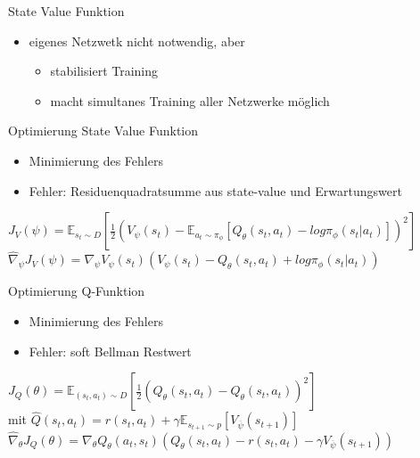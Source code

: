 \begin{frame}{State Value Funktion}
\begin{itemize}
\item eigenes Netzwetk nicht notwendig, aber
\begin{itemize}
\item stabilisiert Training
\item macht simultanes Training aller Netzwerke möglich
\end{itemize}
\end{itemize}
\end{frame}

\begin{frame}{Optimierung State Value Funktion}
\begin{itemize}
\item Minimierung des Fehlers
\item Fehler: Residuenquadratsumme aus state-value und Erwartungswert
\end{itemize}
$J_{V}(\psi)=\mathbb{E}_{s_{t}\sim D}\left[\frac{1}{2}(V_{\psi}(s_{t})-\mathbb{E}_{a_{t}\sim \pi_{\phi}}[Q_{\theta}(s_{t},a_{t})-log \pi_{\phi}(s_{t}|a_{t})])^{2}\right]$ \\[12pt]

$\hat{\nabla}_{\psi}J_{V}(\psi)=\nabla_{\psi}V_{\psi}(s_{t})(V_{\psi}(s_{t})-Q_{\theta}(s_{t},a_{t})+log \pi_{\phi}(s_{t}|a_{t}))$
\end{frame}

\begin{frame}{Optimierung Q-Funktion}
\begin{itemize}
\item Minimierung des Fehlers
\item Fehler: soft Bellman Restwert
\end{itemize}
$J_{Q}(\theta)=\mathbb{E}_{(s_{t},a_{t})\sim D}\left[\frac{1}{2}(Q_{\theta}(s_{t},a_{t})-\hat Q_{\theta}(s_{t},a_{t}))^{2}\right]$ \\[12pt]

mit $\hat Q(s_{t},a_{t})=r(s_{t},a_{t})+\gamma \mathbb{E}_{s_{t+1}\sim p}[V_{\overline{\psi}}(s_{t+1})]$ \\[12pt]

$\hat{\nabla}_{\theta}J_{Q}(\theta)=\nabla_{\theta}Q_{\theta}(a_{t},s_{t})(Q_{\theta}(s_{t},a_{t})-r(s_{t},a_{t})-\gamma V_{\overline{\psi}}(s_{t+1}))$
\end{frame}


